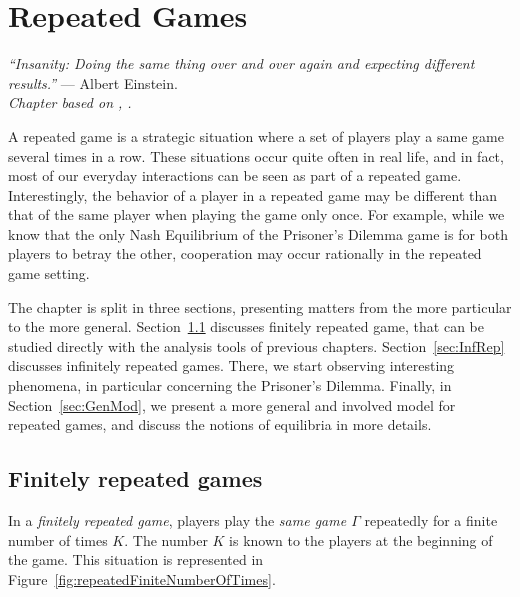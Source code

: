 \ifx \globalmark \undefined %
	
\else
\fi




\chapter{Repeated Games}
{\large{\itshape
``Insanity: Doing the same thing over and over again and expecting different results.''} --- Albert Einstein.\\
}
\label{chap:Rep}
{\small{\itshape
Chapter based on \cite[pages 308 - 331]{MyGTAO}, \cite[Section 6.1]{ShLeMSAG}.}\\
}

A repeated game is a strategic situation where a set of players play a same
game several times in a row. These situations occur quite often in real life,
and in fact, most of our everyday interactions can be seen as part of a
repeated game.\\
Interestingly, the behavior of a player in a repeated game may be different
than that of the same player when playing the game only once. For example,
while we know that the only Nash Equilibrium of the Prisoner's Dilemma game
is for both players to betray the other, cooperation may occur rationally
in the repeated game setting.

The chapter is split in three sections, presenting matters from the more
particular to the more general. Section~\ref{sec:FinRep} discusses finitely
repeated game, that can be studied directly with the analysis tools of
previous chapters. Section~\ref{sec:InfRep} discusses infinitely repeated
games. There, we start observing interesting phenomena, in particular
concerning the Prisoner's Dilemma. Finally, in Section~\ref{sec:GenMod}, we
present a more general and involved model for repeated games, and discuss
the notions of equilibria in more details.

\section{Finitely repeated games}
\label{sec:FinRep}
In a \emph{finitely repeated game}, players play the \emph{same game
$\Gamma$} repeatedly for a finite number of times $K$. The number $K$ is
known to the players at the beginning of the game. This situation is
represented in Figure~\ref{fig:repeatedFiniteNumberOfTimes}.

